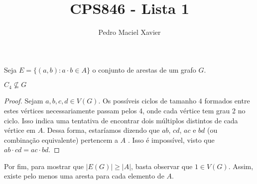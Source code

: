 \documentclass{homework}
\title{CPS846 - Lista 1}
\author{Pedro Maciel Xavier}
\begin{document}
	
	\maketitle
	
		
	\quest[Prove que $ex(n, K_{s, t}) = O(n^{2 - \frac{1}{s}})$.] %

	
	\quest[Seja $A$ um \textit{conjunto multiplicativo de Sidon}, i.e., um conjunto tal que $x, y, z, w \in A$ são tais que $x y = z w$ então $\{x, y\} = \{z, w\}$. Use $A$ para construir um grafo $G_A$ livre de $C_4$ tal que $|E(G_A)| \ge |A|$.] %
	
	Seja $E = \{(a, b) : a \cdot b \in A\}$ o conjunto de arestas de um grafo $G$.
	
	\begin{supposition}
		$C_4 \not\subseteq G$
	\end{supposition}
	\begin{proof}
		Sejam $a, b, c, d \in V(G)$. Os possíveis ciclos de tamanho $4$ formados entre estes vértices necessariamente passam pelos 4, onde cada vértice tem grau 2 no ciclo. Isso indica uma tentativa de encontrar dois múltiplos distintos de cada vértice em $A$. Dessa forma, estaríamos dizendo que $a b$, $c d$, $a c$ e $b d$ (ou combinação equivalente) pertencem a $A$ . Isso é impossível, visto que $ab \cdot cd = ac \cdot bd$.
	\end{proof}

	Por fim, para mostrar que $|E(G)| \ge |A|$, basta observar que $1 \in V(G)$. Assim, existe pelo menos uma aresta para cada elemento de $A$.
\end{document}
